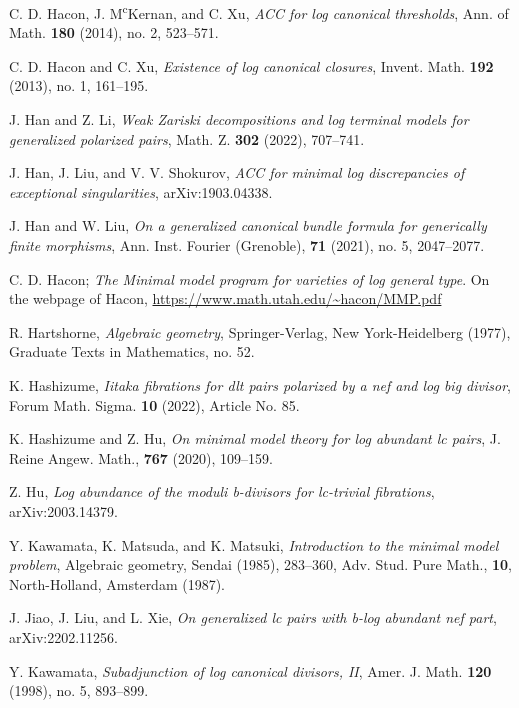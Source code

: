 \documentclass[11pt]{amsart}
\numberwithin{equation}{section}
\theoremstyle{definition}
\theoremstyle{definition}
\theoremstyle{definition}
\begin{document}
\begin{thebibliography}{99}
   C. D. Hacon, J. M\textsuperscript{c}Kernan, and C. Xu, \textit{ACC for log canonical thresholds}, Ann. of Math. \textbf{180} (2014), no. 2, 523--571.

   C. D. Hacon and C. Xu, \textit{Existence of log canonical closures}, Invent. Math. \textbf{192} (2013), no. 1, 161--195.

   J. Han and Z. Li, \textit{Weak Zariski decompositions and log terminal models for generalized polarized pairs}, Math. Z. \textbf{302} (2022), 707--741.

   J. Han, J. Liu, and V. V. Shokurov, \textit{ACC for minimal log discrepancies of exceptional singularities}, arXiv:1903.04338.

   J. Han and W. Liu, \textit{On a generalized canonical bundle formula for generically finite morphisms},  Ann. Inst. Fourier (Grenoble), \textbf{71} (2021), no. 5, 2047--2077.

   C. D. Hacon; \textit{The {{Minimal}} model program for {{varieties}} of log general type}. On the webpage of Hacon, \url{https://www.math.utah.edu/~hacon/MMP.pdf}

   R. Hartshorne, \textit{Algebraic geometry}, Springer-Verlag, New York-Heidelberg (1977), Graduate Texts in Mathematics, no. 52.


   K. Hashizume, \textit{Iitaka fibrations for dlt pairs polarized by a nef and log big divisor}, Forum Math. Sigma. \textbf{10} (2022), Article No. 85.

    K. Hashizume and Z. Hu, \textit{On minimal model theory for log abundant lc pairs}, J. Reine Angew. Math., \textbf{767} (2020), 109--159.


   Z. Hu, \textit{Log abundance of the moduli b-divisors for lc-trivial fibrations}, arXiv:2003.14379.

   Y. Kawamata, K. Matsuda, and K. Matsuki, \textit{Introduction to the minimal model problem}, Algebraic geometry, Sendai (1985), 283--360, Adv. Stud. Pure Math., \textbf{10}, North-Holland, Amsterdam (1987).

   J. Jiao, J. Liu, and L. Xie, \textit{On generalized lc pairs with b-log abundant nef part}, arXiv:2202.11256.

   Y. Kawamata, \textit{Subadjunction of log canonical divisors, II}, Amer. J. Math. \textbf{120} (1998), no. 5, 893--899.


\end{thebibliography}
\end{document}
